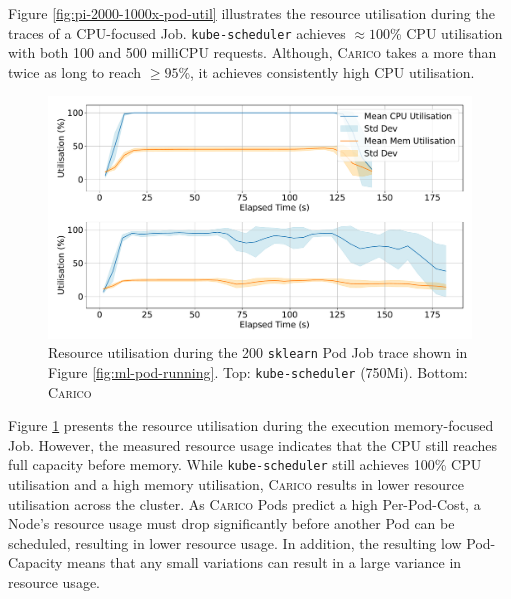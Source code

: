 Figure \ref{fig:pi-2000-1000x-pod-util} illustrates the resource utilisation
during the traces of a CPU-focused Job. \texttt{kube-scheduler} achieves
$\approx100$\% CPU utilisation with both 100 and 500 milliCPU requests.
Although, \textsc{Carico} takes a more than twice as long to reach $\geq 95$\%,
it achieves consistently high CPU utilisation.

\begin{figure}[ht!]
    \centering
    \includegraphics[width=\textwidth]{images/ml-util.pdf}
    \caption{Resource utilisation during the 200 \texttt{sklearn} Pod
    Job trace shown in Figure \ref{fig:ml-pod-running}. Top:
    \texttt{kube-scheduler} (750Mi). Bottom: \textsc{Carico}}
    \label{fig:ml-util}
\end{figure}

Figure \ref{fig:ml-util} presents the resource utilisation during the execution
memory-focused Job. However, the measured resource usage indicates that the CPU
still reaches full capacity before memory. While \texttt{kube-scheduler} still
achieves 100\% CPU utilisation and a high memory utilisation, \textsc{Carico}
results in lower resource utilisation across the cluster. As \textsc{Carico} Pods
predict a high Per-Pod-Cost, a Node's resource usage must drop significantly
before another Pod can be scheduled, resulting in lower resource usage. In
addition, the resulting low Pod-Capacity means that any small variations can
result in a large variance in resource usage.

%
